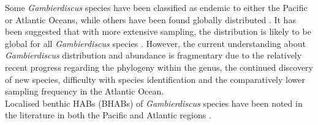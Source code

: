 \documentclass[12pt]{article}
\begin{document}
Some \emph{Gambierdiscus} species have been classified as endemic to either the Pacific or Atlantic Oceans, while others have been found globally distributed \cite{berdalet2012global,litaker2010global}. It has been suggested that with more extensive sampling, the distribution is likely to be global for all \emph{Gambierdiscus} species \cite{testerICHA}. However, the current understanding about \emph{Gambierdiscus} distribution and abundance is fragmentary due to the relatively recent progress regarding the phylogeny within the genus, the continued discovery of new species, difficulty with species identification and the comparatively lower sampling frequency in the Atlantic Ocean. \\
Localised benthic HABs (BHABs) of \emph{Gambierdiscus} species have been noted in the literature in both the Pacific and Atlantic regions \cite{nakajima1981toxicity,withers1984ciguatera,chinain1999seasonal,darius2007ciguatera}.


\end{document}
